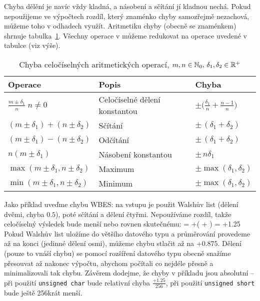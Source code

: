         Chyba dělění je navíc vždy kladná, a násobení a sčítání jí kladnou nechá. Pokud nepoužijeme ve výpočtech rozdíl, který znaménko chyby samozřejmě nezachová, můžeme toho v odhadech využít. Aritmetiku chyby (obecně se znaménkem) shrnuje tabulka~\ref{tabulka max chyby}. Všechny operace v \LAsq můžeme redukovat na operace uvedené v tabulce (viz výše).

        \begin{table}[h]\label{tabulka max chyby}
    \begin{center}
    \begin{tabular}{lll}
      \toprule
      Operace & Popis & Chyba\\
      \midrule
      $\frac{m\pm\delta_1}{n} \; n \neq 0 $ & Celočíselné dělení konstantou & $\pm \Big( \frac{\delta_1}{n} + \frac{n-1}{n}\Big)$ \\
      $(m\pm\delta_1)+(n\pm\delta_2) $      & Sčítání                       & $\pm \,(\delta_1+\delta_2)$ \\
      $(m\pm\delta_1)-(n\pm\delta_2) $      & Odčítání                      & $\pm \,(\delta_1+\delta_2)$ \\
      $n(m\pm\delta_1) $                    & Násobení konstantou           & $\pm \,n\delta_1$ \\
      $\max(m\pm\delta_1,n\pm\delta_2) $    & Maximum                       & $\pm \max(\delta_1,\delta_2)$ \\
      $\min(m\pm\delta_1,n\pm\delta_2) $    & Minimum                       & $\pm \max(\delta_1,\delta_2)$ \\
      \bottomrule
    \end{tabular}
    \caption{Chyba celočíselných aritmetických operací, $m,n \in \mathbb{N}_0, \,\delta_1,\delta_2 \in \mathbb{R}^+$}
    \end{center}
        \end{table}

        Jako příklad uveďme chybu WBES: na vstupu je použit Walshův list (dělení dvěmi, chyba $0.5$), poté sčítání a dělení čtyřmi. Nepoužíváme rozdíl, takže celočíselný výsledek bude menší nebo rovnen skutečnému:
        \beq
        \delta = +\Big(  +  \Big) = +1.25
        \eeq
        Pokud Walshův list uložíme do většího datového typu a průměrování provedeme až na konci (jedinné dělení osmi), můžeme chybu stlačit až na $+0.875$. Dělení (pouze to vnáší chybu) se pomocí rozšíření datového typu obecně snažíme přesouvat až nakonec výpočtu, abychom počítali co nejdéle přesně a minimalizovali tak chybu. Závěrem dodejme, že chyby v příkladu jsou absolutní -- při použití {\tt unsigned char} bude relativní chyba $\frac{+1.25}{256}$, při použití {\tt unsigned short} bude ještě 256krát menší. 

